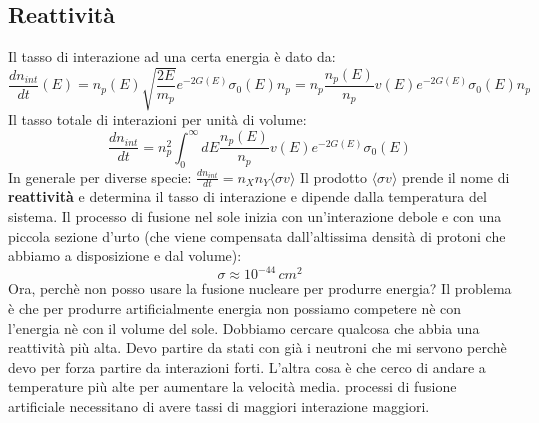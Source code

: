 \subsection{Reattività}
Il tasso di interazione ad una certa energia è dato da:
\begin{equation*}
     \frac{dn_{int}}{dt}(E)=n_p(E)\sqrt{\frac{2E}{m_p}}e^{-2G(E)}\sigma_0(E)n_p=n_p\frac{n_p(E)}{n_p}v(E)e^{-2G(E)}\sigma_0(E)n_p
\end{equation*}
Il tasso totale di interazioni per unità di volume:
\begin{equation*}
    \frac{dn_{int}}{dt}=n_p^2\int_0^{\infty}dE\frac{n_p(E)}{n_p}v(E)e^{-2G(E)}\sigma_0(E)
\end{equation*}
In generale per diverse specie: $\frac{dn_{int}}{dt}=n_Xn_Y\langle\sigma v\rangle$
Il prodotto $\langle\sigma v\rangle$ prende il nome di \textbf{reattività} e determina il tasso di interazione e dipende dalla temperatura del sistema. Il processo di fusione nel sole inizia con un'interazione debole e con una piccola sezione d'urto (che viene compensata dall'altissima densità di protoni che abbiamo a disposizione e dal volume):
\begin{equation*}
    \sigma\approx10^{-44}\,cm^2
\end{equation*}
Ora, perchè non posso usare la fusione nucleare per produrre energia? Il problema è che per produrre artificialmente energia non possiamo competere nè con l'energia nè con il volume del sole. Dobbiamo cercare qualcosa che abbia una reattività più alta. Devo partire da stati con già i neutroni che mi servono perchè devo per forza partire da interazioni forti. L'altra cosa è che cerco di andare a temperature più alte per aumentare la velocità media.
processi di fusione artificiale necessitano di avere tassi di maggiori interazione maggiori.
